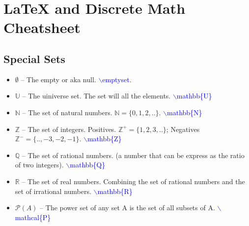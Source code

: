 \documentclass[12pt]{article}
\begin{document}
\section*{LaTeX and Discrete Math Cheatsheet}

\subsection*{Special Sets}

\begin{itemize}
    \item $\emptyset$ -- The empty or aka null. \textcolor{blue} {$\backslash$emptyset}.
    \item $\mathbb{U}$ -- The uiniverse set. The set will all the elements. \textcolor{blue} {$\backslash$mathbb\{U\}}
    \item $\mathbb{N}$ -- The set of natural numbers. $\mathbb{N}=\{0,1,2,..\}$. \textcolor{blue} {$\backslash$mathbb\{N\}}
    \item $\mathbb{Z}$ -- The set of integers. Positives. $\mathbb{Z}^+=\{1, 2, 3,..\}$; Negatives $\mathbb{Z}^-=\{..,-3, -2, -1\}$. \textcolor{blue} {$\backslash$mathbb\{Z\}}
    \item $\mathbb{Q}$ -- The set of rational numbers. (a number that can be express as the ratio of two integers). \textcolor{blue} {$\backslash$mathbb\{Q\}}
    \item $\mathbb{R}$ -- The set of real numbers. Combining the set of rational numbers and the set of irrational numbers. \textcolor{blue} {$\backslash$mathbb\{R\}}
    \item $\mathcal{P} (A)$ -- The power set of any set A is the set of all subsets of A. \textcolor{blue} {$\backslash$mathcal\{P\}}
\end{itemize}
\end{document}
